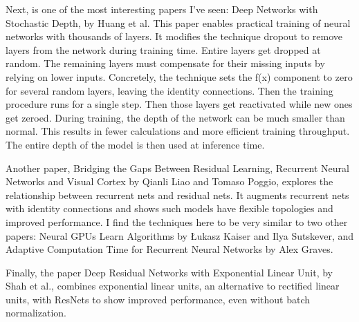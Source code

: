 \documentclass[12pt]{article}
\numberwithin{equation}{section}
\numberwithin{table}{section}
\numberwithin{figure}{section}
\begin{document}
Next, is one of the most interesting papers I’ve seen: Deep Networks with Stochastic Depth, by Huang et al. This paper enables practical training of neural networks with thousands of layers. It modifies the technique dropout to remove layers from the network during training time. Entire layers get dropped at random. The remaining layers must compensate for their missing inputs by relying on lower inputs. Concretely, the technique sets the f(x) component to zero for several random layers, leaving the identity connections. Then the training procedure runs for a single step. Then those layers get reactivated while new ones get zeroed. During training, the depth of the network can be much smaller than normal. This results in fewer calculations and more efficient training throughput. The entire depth of the model is then used at inference time.

%


Another paper, Bridging the Gaps Between Residual Learning, Recurrent Neural Networks and Visual Cortex by Qianli Liao and Tomaso Poggio, explores the relationship between recurrent nets and residual nets. It augments recurrent nets with identity connections and shows such models have flexible topologies and improved performance. I find the techniques here to be very similar to two other papers: Neural GPUs Learn Algorithms by Łukasz Kaiser and Ilya Sutskever, and Adaptive Computation Time for Recurrent Neural Networks by Alex Graves.

Finally, the paper Deep Residual Networks with Exponential Linear Unit, by Shah et al., combines exponential linear units, an alternative to rectified linear units, with ResNets to show improved performance, even without batch normalization.

\end{document}

